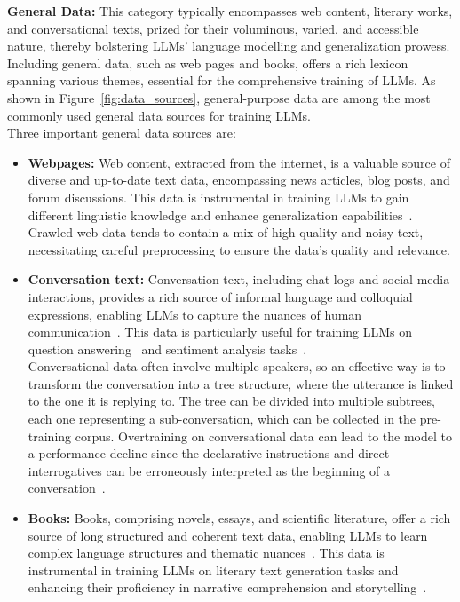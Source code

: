 \textbf{General Data:} This category typically encompasses web content, literary works, and conversational texts, prized for their voluminous, varied, and accessible nature, thereby bolstering LLMs' language modelling and generalization prowess. Including general data, such as web pages and books, offers a rich lexicon spanning various themes, essential for the comprehensive training of LLMs. As shown in Figure~\ref{fig:data_sources}, general-purpose data are among the most commonly used general data sources for training LLMs.\\
Three important general data sources are:
\begin{itemize}
	\item \textbf{Webpages:} {Web content, extracted from the internet, is a valuable source of diverse and up-to-date text data, encompassing news articles, blog posts, and forum discussions. This data is instrumental in training LLMs to gain different linguistic knowledge and enhance generalization capabilities~\cite{brown2020language, raffel2023exploring}.
		      Crawled web data tends to contain a mix of high-quality and noisy text, necessitating careful preprocessing to ensure the data's quality and relevance.
	      }
	\item \textbf{Conversation text:} {
		      Conversation text, including chat logs and social media interactions, provides a rich source of informal language and colloquial expressions, enabling LLMs to capture the nuances of human communication~\cite{zhang2022opt}. This data is particularly useful for training LLMs on question answering~\cite{chowdhery2022palm} and sentiment analysis tasks~\cite{zellers2019defending}.\\
		      Conversational data often involve multiple speakers, so an effective way is to transform the conversation into a tree structure, where the utterance is linked to the one it is replying to. The tree can be divided into multiple subtrees, each one representing a sub-conversation, which can be collected in the pre-training corpus.
		      Overtraining on conversational data can lead to the model to a performance decline since the declarative instructions and direct interrogatives can be erroneously interpreted as the beginning of a conversation~\cite{zhang2022opt}.
	      }
	\item \textbf{Books:} {
		      Books, comprising novels, essays, and scientific literature, offer a rich source of long structured and coherent text data, enabling LLMs to learn complex language structures and thematic nuances~\cite{zhu2015aligning}. This data is instrumental in training LLMs on literary text generation tasks and enhancing their proficiency in narrative comprehension and storytelling~\cite{radford2019language}.
	      }
\end{itemize}

